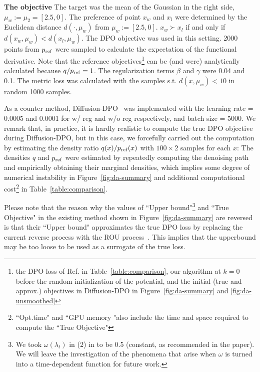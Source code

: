 \textbf{The objective}
The target was the mean of the Gaussian in the right side, $\mu_w := \mu_2 = [2.5,0]$.
The preference of point $x_w$ and $x_l$ were determined by the Euclidean distance $d(\cdot, \mu_w) $ from $\mu_w := [2.5,0]$. $x_w \succ x_l$ if and only if $d(x_w,\mu_w) < d(x_l,\mu_w)$.
The DPO objective was used in this setting. 2000 points from $p_{\rm{ref}}$ were sampled to calculate the expectation of the functional derivative. 
Note that the reference objectives\footnote{the DPO loss of Ref. in Table~\ref{table:comparison}, our algorithm at $k=0$ before the random initialization of the potential, and the initial (true and approx.) objectives in Diffusion-DPO in Figure~\ref{fig:da-summary} and \ref{fig:da-unsmoothed}} can be (and were) analytically calculated because $q/p_{\rm{ref}} = 1$.
The regularization terms $\beta$ and $\gamma$ were 0.04 and 0.1. The metric loss was calculated with the samples s.t. $d(x,\mu_w)<10$ in random 1000 samples.

As a counter method, Diffusion-DPO~\citep{Wallace2024DiffusionDPO} was implemented with the learning rate = 0.0005 and 0.0001 for w/ reg and w/o reg respectively, and batch size = 5000.
We remark that, in practice, it is hardly realistic to compute the true DPO objective during Diffusion-DPO, but in this case, we forcefully carried out the computation by estimating the density ratio $q(x)/p_{\rm{ref}}(x)$ with $100 \times 2$ samples for each $x$: The densities $q$ and $p_{\rm{ref}}$ were estimated by repeatedly computing the denoising path and empirically obtaining their marginal densities, which implies some degree of numerical instability in Figure~\ref{fig:da-summary} and additional computational cost\footnote{``Opt.time" and ``GPU memory "also include the time and space required to compute the ``True Objective"}  in Table~\ref{table:comparison}.

Please note that the reason why the values of ``Upper bound"\footnote{We took $\omega(\lambda_t)$ in (2) in \cite{Wallace2024DiffusionDPO} to be 0.5 (constant, as recommended in the paper). 
We will leave the investigation of the phenomena that arise when \(\omega\) is turned into a time-dependent function for future work.
}
 and ``True Objective" in the existing method shown in Figure~\ref{fig:da-summary} are reversed is that their ``Upper bound" approximates the true DPO loss by replacing the current reverse process with the ROU process~\citep{Wallace2024DiffusionDPO}.
This implies that the upperbound may be too loose to be used as a surrogate of the true loss.

